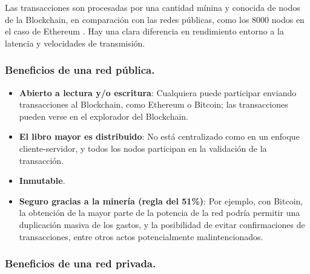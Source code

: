 \vspace{5mm}

\noindent Las transacciones son procesadas por una cantidad mínina y conocida de nodos de la Blockchain, en comparación 
con las redes públicas, como los 8000 nodos en el caso de Ethereum \cite{ethereum-nodes}. Hay una clara diferencia en 
rendimiento entorno a la latencia y velocidades de transmisión.

\subsubsection*{Beneficios de una red pública.}

\begin{itemize}
\item \textbf{Abierto a lectura y/o escritura}: Cualquiera puede participar enviando transacciones al Blockchain, como 
Ethereum o Bitcoin; las transacciones pueden verse en el explorador del Blockchain.

\item \textbf{El libro mayor es distribuido}: No está centralizado como en un enfoque cliente-servidor, y todos los 
nodos participan en la validación de la transacción.

\item \textbf{Inmutable}.

\item \textbf{Seguro gracias a la minería (regla del 51\%)}: Por ejemplo, con Bitcoin, la obtención de la mayor parte 
de la potencia de la red podría permitir una duplicación masiva de los gastos, y la posibilidad de evitar 
confirmaciones de transacciones, entre otros actos potencialmente malintencionados.
\end{itemize}

\subsubsection*{Beneficios de una red privada.}

